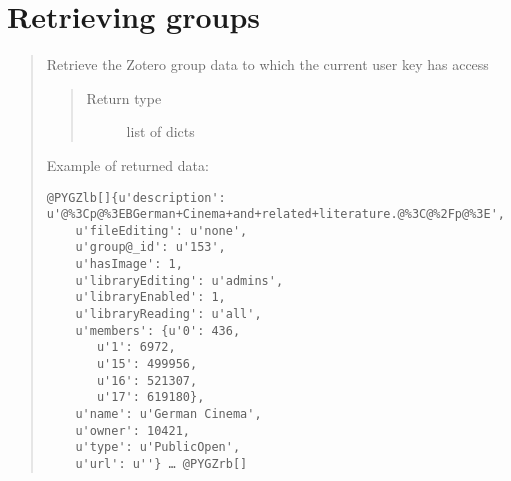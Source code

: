 \documentclass[letterpaper,10pt,english]{sphinxmanual}
\begin{document}
\section{Retrieving groups}
\label{index:retrieving-groups}\begin{quote}


\begin{fulllineitems}
\label{index:pyzotero.zotero.Zotero.groups}
Retrieve the Zotero group data to which the current user key has access
\begin{quote}\begin{description}
\item[{Return type}] \leavevmode
list of dicts

\end{description}\end{quote}

Example of returned data:

\begin{Verbatim}[commandchars=@\[\]]
@PYGZlb[]{u'description': u'@%3Cp@%3EBGerman+Cinema+and+related+literature.@%3C@%2Fp@%3E',
    u'fileEditing': u'none',
    u'group@_id': u'153',
    u'hasImage': 1,
    u'libraryEditing': u'admins',
    u'libraryEnabled': 1,
    u'libraryReading': u'all',
    u'members': {u'0': 436,
       u'1': 6972,
       u'15': 499956,
       u'16': 521307,
       u'17': 619180},
    u'name': u'German Cinema',
    u'owner': 10421,
    u'type': u'PublicOpen',
    u'url': u''} … @PYGZrb[]
\end{Verbatim}

\end{fulllineitems}

\end{quote}
\end{document}
